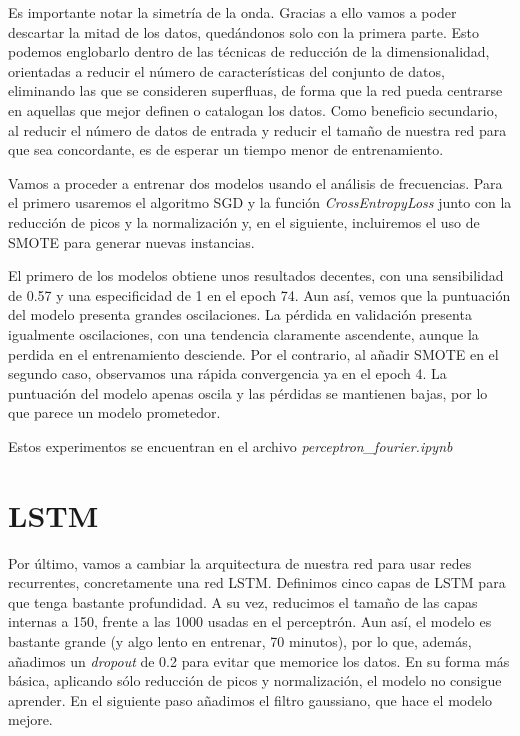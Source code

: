 
Es importante notar la simetría de la onda. Gracias a ello vamos a poder descartar la mitad de los datos, quedándonos solo con la primera parte. Esto podemos englobarlo dentro de las técnicas de reducción de la dimensionalidad, orientadas a reducir el número de características del conjunto de datos, eliminando las que se consideren superfluas, de forma que la red pueda centrarse en aquellas que mejor definen o catalogan los datos. Como beneficio secundario, al reducir el número de datos de entrada y reducir el tamaño de nuestra red para que sea concordante, es de esperar un tiempo menor de entrenamiento.


Vamos a proceder a entrenar dos modelos usando el análisis de frecuencias. Para el primero usaremos el algoritmo SGD y la función \textit{CrossEntropyLoss} junto con la reducción de picos y la normalización y, en el siguiente, incluiremos el uso de SMOTE para generar nuevas instancias. 

El primero de los modelos obtiene unos resultados decentes, con una sensibilidad de 0.57 y una especificidad de 1 en el epoch 74. Aun así, vemos que la puntuación del modelo presenta grandes oscilaciones. La pérdida en validación presenta igualmente oscilaciones, con una tendencia claramente ascendente, aunque la perdida en el entrenamiento desciende. Por el contrario, al añadir SMOTE en el segundo caso, observamos una rápida convergencia ya en el epoch 4. La puntuación del modelo apenas oscila y las pérdidas se mantienen bajas, por lo que parece un modelo prometedor.

Estos experimentos se encuentran en el archivo \textit{perceptron\_fourier.ipynb}

\section{LSTM}

Por último, vamos a cambiar la arquitectura de nuestra red para usar redes recurrentes, concretamente una red LSTM. Definimos cinco capas de LSTM para que tenga bastante profundidad. A su vez, reducimos el tamaño de las capas internas a 150, frente a las 1000 usadas en el perceptrón. Aun así, el modelo es bastante grande (y algo lento en entrenar, 70 minutos), por lo que, además, añadimos un \textit{dropout} de 0.2 para evitar que memorice los datos. En su forma más básica, aplicando sólo reducción de picos y normalización, el modelo no consigue aprender. En el siguiente paso añadimos el filtro gaussiano, que hace el modelo mejore.

